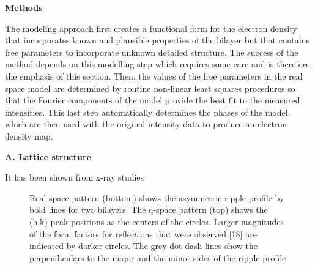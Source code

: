 
\vspace{0.128in}
\noindent
{\bf Methods}
\vspace{0.128in}

The modeling approach first creates a functional form for the electron density 
that incorporates known and plausible properties of the bilayer but that
contains free parameters to incorporate unknown detailed structure.
The success of the method depends on this modelling step which requires some care
and is therefore the emphasis of this section.
Then, the values of the free parameters in the real space model are 
determined by routine non-linear least squares procedures so that the Fourier
components of the model provide the best fit to the measured intensities.
This last step automatically determines the phases of the model, which are
then used with the original intensity data to produce an electron density map.

\vspace{0.128in}
\noindent
{\bf A. Lattice structure}
\vspace{0.128in}

It has been shown from x-ray studies \cite{Tar73,JanSS79,Ino80,Ale85,%
Wac89a,Kat95} 

\begin{figure}[t]
\centerline {}
\vspace{11pt}
\caption{Real space pattern (bottom) shows the asymmetric ripple profile by 
bold lines for two bilayers.  The q-space pattern (top) shows the (h,k) 
peak positions as the centers of the circles.  Larger magnitudes of the 
form factors for reflections that were observed [18] are indicated 
by darker circles.  The grey dot-dash lines show the perpendiculars to the 
major and the minor sides of the ripple profile.
\label{Fig1}}
\end{figure}

